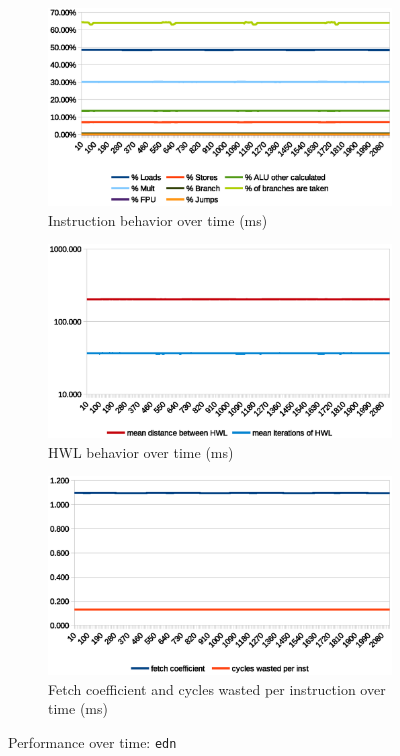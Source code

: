 \documentclass[../bachelor_paper.tex]{subfiles}
\begin{document}
\begin{figure}
    \begin{subfigure}{0.45\textwidth}
        \includegraphics[width=\textwidth]{img/graph/embench/edn_inst.eps}
        \caption{Instruction behavior over time (ms)}
    \end{subfigure}
    \begin{subfigure}{0.45\textwidth}
        \includegraphics[width=\textwidth]{img/graph/embench/edn_hwl.eps}
        \caption{\ac{HWL} behavior over time (ms)}
    \end{subfigure}
    \begin{subfigure}{0.45\textwidth}
        \includegraphics[width=\textwidth]{img/graph/embench/edn_fetch_waste.eps}
        \caption{Fetch coefficient and cycles wasted per instruction over time (ms)}
    \end{subfigure}
    \caption{Performance over time: \texttt{edn}}
\end{figure}
\end{document}

